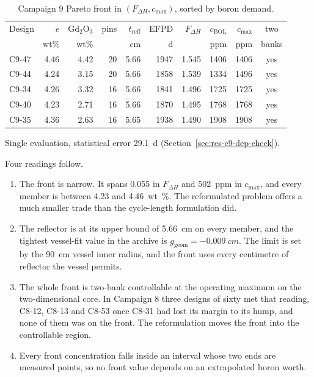 \begin{table}[htbp]
  \centering
  \begin{threeparttable}
  \caption{Campaign 9 Pareto front in $(F_{\Delta H}, c_\mathrm{max})$, sorted by boron demand.}
  \label{tab:c9-front}
  \small
  \begin{tabular}{@{}lrrrrrrrrc@{}}
    \toprule
    Design & $e$ & Gd$_2$O$_3$ & pins & $t_\mathrm{refl}$ & EFPD\tnote{a} &
    $F_{\Delta H}$ & $c_\mathrm{BOL}$ & $c_\mathrm{max}$ & two \\
     & wt\% & wt\% & & cm & d & & ppm & ppm & banks \\
    \midrule
    C9-47 & 4.46 & 4.42 & 20 & 5.66 & 1947 & 1.545 & 1406 & 1406 & yes \\
    C9-44 & 4.24 & 3.15 & 20 & 5.66 & 1858 & 1.539 & 1334 & 1496 & yes \\
    C9-34 & 4.26 & 3.32 & 16 & 5.66 & 1841 & 1.496 & 1725 & 1725 & yes \\
    C9-40 & 4.23 & 2.71 & 16 & 5.66 & 1870 & 1.495 & 1768 & 1768 & yes \\
    C9-35 & 4.36 & 2.63 & 16 & 5.65 & 1938 & 1.490 & 1908 & 1908 & yes \\
    \bottomrule
  \end{tabular}
  \begin{tablenotes}[flushleft]\footnotesize
    \item[a] Single evaluation, statistical error \SI{29.1}{d}
      (Section~\ref{sec:res-c9-dep-check}).
  \end{tablenotes}
  \end{threeparttable}
\end{table}

Four readings follow.

\begin{enumerate}
  \item The front is narrow. It spans 0.055 in $F_{\Delta H}$ and
        \SI{502}{ppm} in $c_\mathrm{max}$, and every member is between
        4.23 and \SI{4.46}{wt\%}. The reformulated problem offers a much
        smaller trade than the cycle-length formulation did.

  \item The reflector is at its upper bound of \SI{5.66}{cm} on every
        member, and the tightest vessel-fit value in the archive is
        $g_\mathrm{geom} = \SI{-0.009}{cm}$. The limit is set by the
        \SI{90}{cm} vessel inner radius, and the front uses every
        centimetre of reflector the vessel permits.

  \item The whole front is two-bank controllable at the operating maximum
        on the two-dimensional core. In Campaign 8 three designs of sixty
        met that reading, C8-12, C8-13 and C8-53 once C8-31 had lost its
        margin to its hump, and none of them was on the front. The reformulation
        moves the front into the controllable region.

  \item Every front concentration falls inside an interval whose two
        ends are measured points, so no front value depends on an
        extrapolated boron worth.
\end{enumerate}

